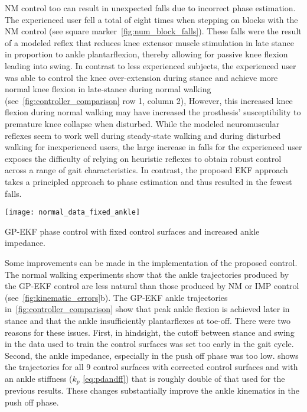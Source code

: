 NM control too can result in unexpected falls due to incorrect phase estimation.
The experienced user fell a total of eight times when stepping on blocks with
the NM control (see square marker~\cref{fig:num_block_falls}). These falls were
the result of a modeled reflex that reduces knee extensor muscle stimulation in
late stance in proportion to ankle plantarflexion, thereby allowing for passive
knee flexion leading into swing. In contrast to less experienced subjects, the
experienced user was able to control the knee over-extension during stance and
achieve more normal knee flexion in late-stance during normal walking
(see~\cref{fig:controller_comparison} row 1, column 2), However, this increased
knee flexion during normal walking may have increased the prosthesis'
susceptibility to premature knee collapse when disturbed. While the modeled
neuromuscular reflexes seem to work well during steady-state walking and during
disturbed walking for inexperienced users, the large increase in falls for the
experienced user exposes the difficulty of relying on heuristic reflexes to
obtain robust control across a range of gait characteristics. In contrast, the
proposed EKF approach takes a principled approach to phase estimation and thus
resulted in the fewest falls.

\begin{marginfigure}
    \centering
    \texttt{[image: normal\_data\_fixed\_ankle]}
    \caption{GP-EKF phase control with fixed control surfaces and
    increased ankle impedance.}\label{fig:gp_ekf_fixed}
\end{marginfigure}
Some improvements can be made in the implementation of the proposed control.
The normal walking experiments show that the ankle trajectories produced by the
GP-EKF control are less natural than those produced by NM or IMP control
(see~\cref{fig:kinematic_errors}b). The GP-EKF ankle trajectories
in~\cref{fig:controller_comparison} show that peak ankle flexion is achieved
later in stance and that the ankle insufficiently plantarflexes at toe-off.
There were two reasons for these issues. First, in hindsight, the cutoff between
stance and swing in the data used to train the control surfaces was set too
early in the gait cycle. Second, the ankle impedance, especially in the push off
phase was too low.  shows the trajectories for all 9
control surfaces with corrected control surfaces and with an ankle stiffness
($k_p$ \cref{eq:pdandff}) that is roughly double of that used for the previous
results. These changes substantially improve the ankle kinematics in the push
off phase.


